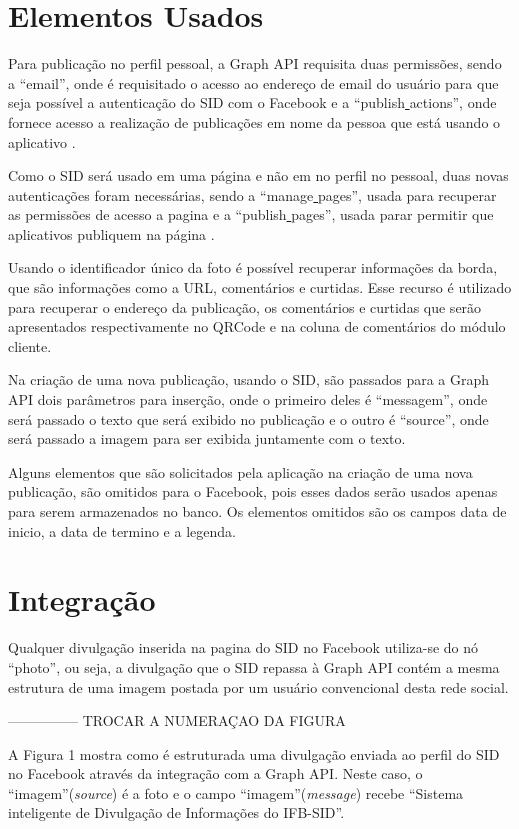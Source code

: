 \section{Elementos Usados}
Para publicação no perfil pessoal, a Graph API requisita duas permissões, sendo a “email”, onde é requisitado o acesso ao endereço de email do usuário para que seja possível a autenticação do SID com o Facebook e a “publish\underline{{ }}actions”, onde fornece acesso a realização de publicações em nome da pessoa que está usando o aplicativo \cite{facebook2018a}.

Como o SID será usado em uma página e não em no perfil no pessoal, duas novas autenticações foram necessárias, sendo a “manage\underline{{ }}pages”, usada para recuperar as permissões de acesso a pagina e a “publish\underline{{ }}pages”, usada parar permitir que aplicativos publiquem na página \cite{facebook2018a}.

Usando o identificador único da foto é possível recuperar informações da borda, que são informações como a URL, comentários e curtidas. Esse recurso é utilizado para recuperar o endereço da publicação, os comentários e curtidas que serão apresentados respectivamente no QRCode e na coluna de comentários do módulo cliente.

Na criação de uma nova publicação, usando o SID, são passados para a Graph API dois parâmetros para inserção, onde o primeiro deles é “messagem”, onde será passado o texto que será exibido no publicação e o outro é “source”, onde será passado a imagem para ser exibida juntamente com o texto.

Alguns elementos que são solicitados pela aplicação na criação de uma nova publicação, são omitidos para o Facebook, pois esses dados serão usados apenas para serem armazenados no banco. Os elementos omitidos são os campos data de inicio, a data de termino e a legenda. 

\section{Integração}
Qualquer divulgação inserida na pagina do SID no Facebook utiliza-se do nó “photo”, ou seja, a divulgação que o SID repassa à Graph API contém a mesma estrutura de uma imagem postada por um usuário convencional desta rede social. 

--------------- TROCAR A NUMERAÇAO DA FIGURA

A Figura 1 mostra como é estruturada uma divulgação enviada ao perfil do SID no Facebook através da integração com a Graph API. Neste caso, o ``imagem''(\textit{source}) é a foto e o campo ``imagem''(\textit{message}) recebe “Sistema inteligente de Divulgação de Informações do IFB-SID”. 


